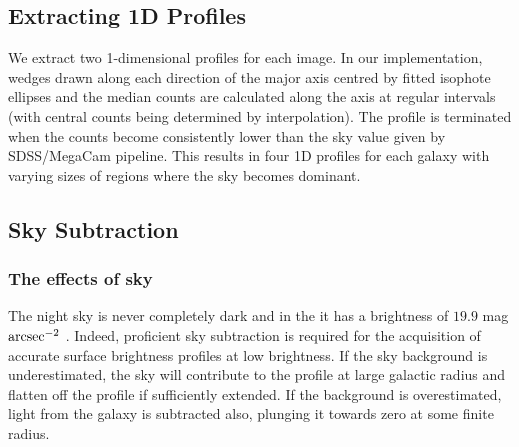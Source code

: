 \subsection{Extracting 1D Profiles}
We extract two 1-dimensional profiles for each image. In our implementation, wedges drawn along each direction of the major axis centred by fitted isophote ellipses and the median counts are calculated along the axis at regular intervals (with central counts being determined by interpolation). The profile is terminated when the counts become consistently lower than the sky value given by SDSS/MegaCam pipeline. This results in four 1D profiles for each galaxy with varying sizes of regions where the sky becomes dominant. 

\subsection{Sky Subtraction}
\subsubsection{The effects of sky}
The night sky is never completely dark and in the \iband it has a brightness of $19.9$ mag $\rm{arcsec}^{-2}$ \citep{binney_galactic_1998}. Indeed, proficient sky subtraction is required for the acquisition of accurate surface brightness profiles at low brightness. If the sky background is underestimated, the sky will contribute to the profile at large galactic radius and flatten off the profile if sufficiently extended. If the background is overestimated, light from the galaxy is subtracted also, plunging it towards zero at some finite radius. 

